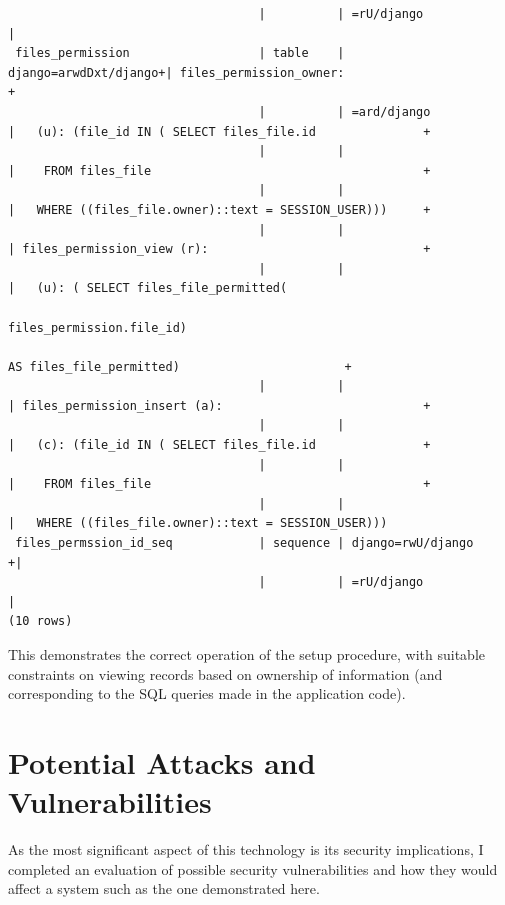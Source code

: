 \documentclass[12pt]{report}
\begin{document}
\begin{landscape}
{\begin{verbatim}
                                   |          | =rU/django            |
 files_permission                  | table    | django=arwdDxt/django+| files_permission_owner:                                 +
                                   |          | =ard/django           |   (u): (file_id IN ( SELECT files_file.id               +
                                   |          |                       |    FROM files_file                                      +
                                   |          |                       |   WHERE ((files_file.owner)::text = SESSION_USER)))     +
                                   |          |                       | files_permission_view (r):                              +
                                   |          |                       |   (u): ( SELECT files_file_permitted(
                                                                                 files_permission.file_id)
                                                                                 AS files_file_permitted)                       +
                                   |          |                       | files_permission_insert (a):                            +
                                   |          |                       |   (c): (file_id IN ( SELECT files_file.id               +
                                   |          |                       |    FROM files_file                                      +
                                   |          |                       |   WHERE ((files_file.owner)::text = SESSION_USER)))
 files_permssion_id_seq            | sequence | django=rwU/django    +|
                                   |          | =rU/django            |
(10 rows)
\end{verbatim}
  }

  This demonstrates the correct operation of the setup procedure, with suitable constraints on viewing records based on ownership of information (and corresponding to the SQL queries made in the application code).

\end{landscape}

\section{Potential Attacks and Vulnerabilities}
As the most significant aspect of this technology is its security implications, I completed an evaluation of possible security vulnerabilities and how they would affect a system such as the one demonstrated here.
\end{document}
